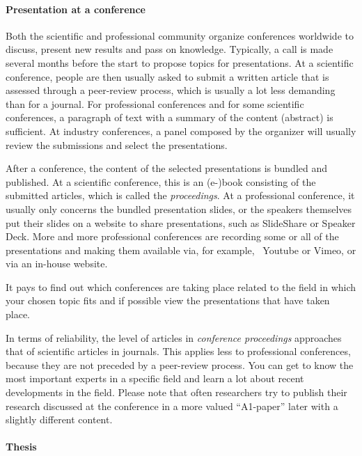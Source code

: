 \paragraph{Presentation at a conference}

Both the scientific and professional community organize conferences worldwide to discuss, present new results and pass on knowledge. Typically, a call is made several months before the start to propose topics for presentations. At a scientific conference, people are then usually asked to submit a written article that is assessed through a peer-review process, which is usually a lot less demanding than for a journal. For professional conferences and for some scientific conferences, a paragraph of text with a summary of the content (abstract) is sufficient. At industry conferences, a panel composed by the organizer will usually review the submissions and select the presentations.

After a conference, the content of the selected presentations is bundled and published. At a scientific conference, this is an (e-)book consisting of the submitted articles, which is called the \emph{proceedings}. At a professional conference, it usually only concerns the bundled presentation slides, or the speakers themselves put their slides on a website to share presentations, such as SlideShare or Speaker Deck. More and more professional conferences are recording some or all of the presentations and making them available via, for example, ~Youtube or Vimeo, or via an in-house website.

It pays to find out which conferences are taking place related to the field in which your chosen topic fits and if possible view the presentations that have taken place.

In terms of reliability, the level of articles in \emph{conference proceedings} approaches that of scientific articles in journals. This applies less to professional conferences, because they are not preceded by a peer-review process. You can get to know the most important experts in a specific field and learn a lot about recent developments in the field. Please note that often researchers try to publish their research discussed at the conference in a more valued ``A1-paper'' later with a slightly different content.

\paragraph{Thesis}

